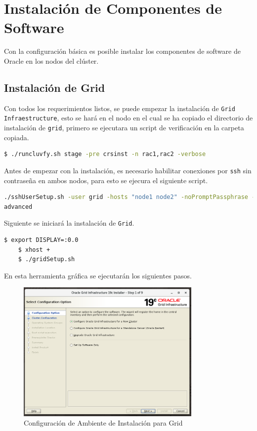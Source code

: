 \documentclass{article}
\begin{document}
\section{Instalación de Componentes de Software}

Con la configuración básica es posible instalar los componentes de software de Oracle en los nodos del clúster.

\subsection{Instalación de Grid}

Con todos los requerimientos listos, se puede empezar la instalación de \texttt{Grid Infraestructure}, esto se hará en el nodo en el cual se ha copiado el directorio de instalación de \texttt{grid}, primero se ejecutara un script de verificación en la carpeta copiada.

\begin{lstlisting}[style=mystyle,language=bash]
	$ ./runcluvfy.sh stage -pre crsinst -n rac1,rac2 -verbose
\end{lstlisting}

Antes de empezar con la instalación, es necesario habilitar conexiones por \texttt{ssh} sin contraseña en ambos nodos, para esto se ejecura el siguiente script.

\begin{lstlisting}[style=mystyle,language=bash]
	./sshUserSetup.sh -user grid -hosts "node1 node2" -noPromptPassphrase -confirm -
advanced
\end{lstlisting}
Siguiente se iniciará la instalación de \texttt{Grid}.

\begin{lstlisting}[style=mystyle,language=bash]
	$ export DISPLAY=:0.0
	$ xhost +
	$ ./gridSetup.sh
\end{lstlisting}

En esta herramienta gráfica se ejecutarán los siguientes pasos.

\begin{figure}[H]
		\begin{center}
			\includegraphics[width=0.80\textwidth]{grid_install_01_initial_grid_install.png}
		\end{center}
		\caption{Configuración de Ambiente de Instalación para Grid}
\end{figure}
\end{document}
